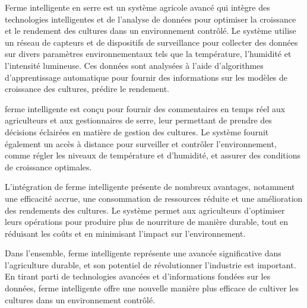 \begin{abstractFr}
	
	Ferme intelligente en serre est un système agricole avancé qui intègre des technologies intelligentes et de l'analyse de données pour optimiser la croissance et le rendement des cultures dans un environnement contrôlé. Le système utilise un réseau de capteurs et de dispositifs de surveillance pour collecter des données sur divers paramètres environnementaux tels que la température, l'humidité et l'intensité lumineuse. Ces données sont analysées à l'aide d'algorithmes d'apprentissage automatique pour fournir des informations sur les modèles de croissance des cultures, prédire le rendement.

ferme intelligente  est conçu pour fournir des commentaires en temps réel aux agriculteurs et aux gestionnaires de serre, leur permettant de prendre des décisions éclairées en matière de gestion des cultures. Le système fournit également un accès à distance pour surveiller et contrôler l'environnement, comme régler les niveaux de température et d'humidité, et assurer des conditions de croissance optimales.

L'intégration de ferme intelligente  présente de nombreux avantages, notamment une efficacité accrue, une consommation de ressources réduite et une amélioration des rendements des cultures. Le système permet aux agriculteurs d'optimiser leurs opérations pour produire plus de nourriture de manière durable, tout en réduisant les coûts et en minimisant l'impact sur l'environnement.

Dans l'ensemble, ferme intelligente  représente une avancée significative dans l'agriculture durable, et son potentiel de révolutionner l'industrie est important. En tirant parti de technologies avancées et d'informations fondées sur les données, ferme intelligente  offre une nouvelle manière plus efficace de cultiver les cultures dans un environnement contrôlé.
	
\end{abstractFr}

